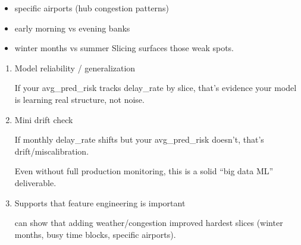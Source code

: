 \documentclass[11pt]{article}
\providecommand{\tightlist}{%
      \setlength{\itemsep}{0pt}\setlength{\parskip}{0pt}}
\begin{document}
\begin{itemize}
\tightlist
\item
  specific airports (hub congestion patterns)
\item
  early morning vs evening banks
\item
  winter months vs summer Slicing surfaces those weak spots.
\end{itemize}

\begin{enumerate}
\def\labelenumi{\arabic{enumi}.}
\setcounter{enumi}{2}
\item
  Model reliability / generalization

  If your avg\_pred\_risk tracks delay\_rate by slice, that's evidence
  your model is learning real structure, not noise.
\item
  Mini drift check

  If monthly delay\_rate shifts but your avg\_pred\_risk doesn't, that's
  drift/miscalibration.

  Even without full production monitoring, this is a solid ``big data
  ML'' deliverable.
\item
  Supports that feature engineering is important

  can show that adding weather/congestion improved hardest slices
  (winter months, busy time blocks, specific airports).
\end{enumerate}
\end{document}
